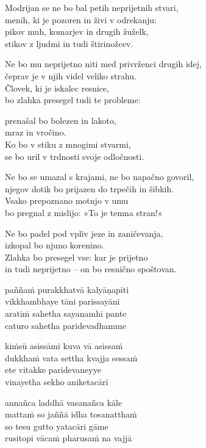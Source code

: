 
\clearpage

Modrijan se ne bo bal petih neprijetnih stvari,\\
menih, ki je pozoren in živi v odrekanju:\\
pikov muh, komarjev in drugih žuželk,\\
stikov z ljudmi in tudi štirinožcev.

Ne bo mu neprijetno niti med privrženci drugih idej,\\
čeprav je v njih videl veliko strahu.\\
Človek, ki je iskalec resnice,\\
bo zlahka presegel tudi te probleme:

prenašal bo bolezen in lakoto,\\
mraz in vročino.\\
Ko bo v stiku z mnogimi stvarmi,\\
se bo uril v trdnosti svoje odločnosti.

Ne bo se umazal s krajami, ne bo napačno govoril,\\
njegov dotik bo prijazen do trpečih in šibkih.\\
Vsako prepoznano motnjo v umu\\
bo pregnal z mislijo: »To je temna stran!«

Ne bo padel pod vpliv jeze in zaničevanja,\\
izkopal bo njuno korenino.\\
Zlahka bo presegel vse: kar je prijetno\\
in tudi neprijetno -- on bo resnično spoštovan.


\clearpage

paññaṁ purakkhatvā kalyāṇapīti\\
vikkhambhaye tāni parissayāni\\
aratiṁ sahetha sayanamhi pante\\
caturo sahetha paridevadhamme

kiṁsū asissāmi kuva vā asissaṁ\\
dukkhaṁ vata settha kvajja sessaṁ\\
ete vitakke paridevaneyye\\
vinayetha sekho aniketacārī

annañca laddhā vasanañca kāle\\
mattaṁ so jaññā idha tosanatthaṁ\\
so tesu gutto yatacāri gāme\\
rusitopi vācaṁ pharusaṁ na vajjā

